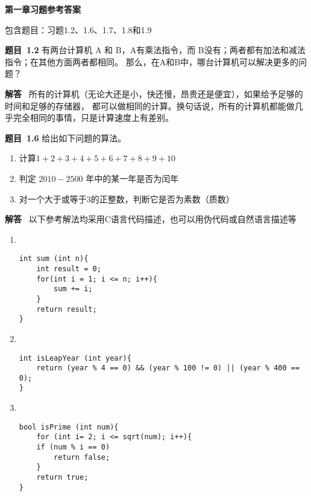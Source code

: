 \documentclass[10pt,a4paper,UTF8]{ctexart}
\newcommand{\problemname}{待定义}
\newenvironment{problem}{\begin{shaded}\par\noindent\textbf{题目\  \problemname}}{\end{shaded}\par}
\newenvironment{solution}{\par\noindent\textbf{解答}\ }{\par}
\begin{document}
\begin{center}
\LARGE\textbf{第一章习题参考答案}
\end{center}

{\kaishu 包含题目：习题1.2、1.6、1.7、1.8和1.9}


\renewcommand{\problemname}{1.2}
\begin{problem}
	有两台计算机 A 和 B，A有乘法指令，而 B没有；两者都有加法和减法指令；在其他方面两者都相同。
	那么，在A和B中，哪台计算机可以解决更多的问题？
\end{problem}

\begin{solution}
	所有的计算机（无论大还是小，快还慢，昂贵还是便宜），如果给予足够的时间和足够的存储器，
	都可以做相同的计算。换句话说，所有的计算机都能做几乎完全相同的事情，只是计算速度上有差别。
\end{solution}


\renewcommand{\problemname}{1.6}
\begin{problem}
	给出如下问题的算法。
	\begin{enumerate}[(1)]
		\item 计算$1+2+3+4+5+6+7+8+9+10$
		\item 判定 $2010-2500$ 年中的某一年是否为闰年
		\item 对一个大于或等于3的正整数，判断它是否为素数（质数）
	\end{enumerate}
\end{problem}

\begin{solution}
	以下参考解法均采用C语言代码描述，也可以用伪代码或自然语言描述等
	\begin{enumerate}[(1)]
		\item \ 
\lstset{language=C}
\begin{lstlisting}
int sum (int n){
	int result = 0;
	for(int i = 1; i <= n; i++){
		sum += i;
	}
	return result;
}
\end{lstlisting}

		\item \ 
\lstset{language=C}
\begin{lstlisting}
int isLeapYear (int year){
	return (year % 4 == 0) && (year % 100 != 0) || (year % 400 == 0);
}
\end{lstlisting}

		\item \ 
\lstset{language=C}
\begin{lstlisting}
bool isPrime (int num){
	for (int i= 2; i <= sqrt(num); i++){
	if (num % i == 0)
		return false;
	}
	return true;
}
\end{lstlisting}
	\end{enumerate}
\end{solution}
\end{document}
